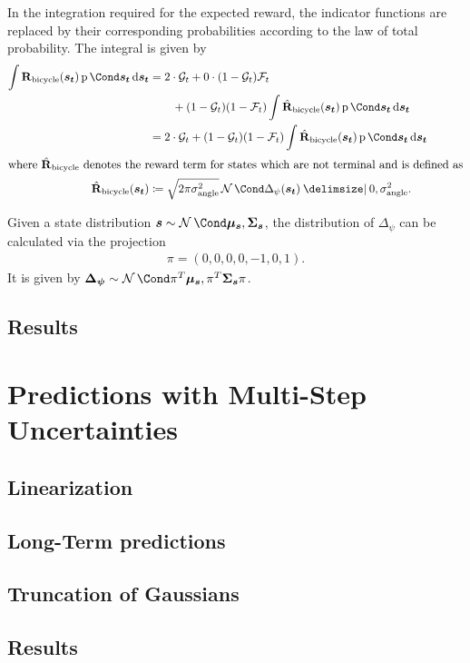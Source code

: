 In the integration required for the expected reward, the indicator functions are replaced by their corresponding probabilities according to the law of total probability.
The integral is given by
\begin{align}
    \int \RwdBicycle(\rv{s_t}) \Prob{\rv{s_t}} \diff \rv{s_t} &= 2 \cdot \PGoal_t + 0 \cdot (1 - \PGoal_t) \PFallen_t \\
    &\qquad + (1 - \PGoal_t)(1 - \PFallen_t) \int \RwdBicycleHat(\rv{s_t}) \Prob{\rv{s_t}} \diff \rv{s_t} \\
    &= 2 \cdot \PGoal_t + (1 - \PGoal_t)(1 - \PFallen_t) \int \RwdBicycleHat(\rv{s_t}) \Prob{\rv{s_t}} \diff \rv{s_t} \\
    \intertext{where $\RwdBicycleHat$ denotes the reward term for states which are not terminal and is defined as}
    \RwdBicycleHat(\rv{s_t}) &\coloneqq \sqrt{2\pi\sigma_{\text{angle}}^2} \Gaussian{\Delta_\psi(\rv{s_t}) \given 0, \sigma_{\text{angle}}^2}.
\end{align}


Given a state distribution $\rv{s} \sim \Gaussian{\mat{\mu_s}, \mat{\Sigma_s}}$, the distribution of $\Delta_\psi$ can be calculated via the projection
\begin{align}
    \pi = \left( 0, 0, 0, 0, -1, 0, 1 \right).
\end{align}
It is given by $\rv{\Delta_\psi} \sim \Gaussian{\pi^T\mat{\mu_s}, \pi^T \mat{\Sigma_s} \pi}$.
\subsection{Results}
\section{Predictions with Multi-Step Uncertainties}
\subsection{Linearization}
\subsection{Long-Term predictions}
\subsection{Truncation of Gaussians}
\subsection{Results}
